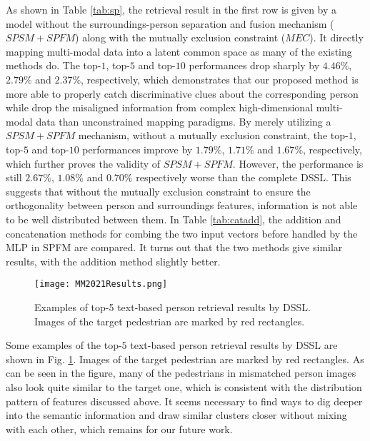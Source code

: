 \documentclass[sigconf]{acmart}
\begin{document}
As shown in Table \ref{tab:sp}, the retrieval result in the first row is given by a model without the surroundings-person separation and fusion mechanism ($SPSM + SPFM$) along with the mutually exclusion constraint ($MEC$). It directly mapping multi-modal data into a latent common space as many of the existing methods do. The top-$1$, top-$5$ and top-$10$ performances drop sharply by $4.46\%$, $2.79\%$ and $2.37\%$, respectively, which demonstrates that our proposed method is more able to properly catch discriminative clues about the corresponding person while drop the misaligned information from complex high-dimensional multi-modal data than unconstrained mapping paradigms. By merely utilizing a $SPSM + SPFM$ mechanism, without a mutually exclusion constraint, the top-$1$, top-$5$ and top-$10$ performances improve by $1.79\%$, $1.71\%$ and $1.67\%$, respectively, which further proves the validity of $SPSM + SPFM$. However, the performance is still $2.67\%$, $1.08\%$ and $0.70\%$ respectively worse than the complete DSSL. This suggests that without the mutually exclusion constraint to ensure the orthogonality between person and surroundings features, information is not able to be well distributed between them. In Table \ref{tab:catadd}, the addition and concatenation methods for combing the two input vectors before handled by the MLP in SPFM are compared. It turns out that the two methods give similar results, with the addition method slightly better.

\begin{figure}[h]
	\centering
	\texttt{[image: MM2021Results.png]}
	\caption{Examples of top-5 text-based person retrieval results by DSSL. Images of the target pedestrian are marked by red rectangles.}
	\label{fig:results}
\end{figure}

Some examples of the top-$5$ text-based person retrieval results by DSSL are shown in Fig. \ref{fig:results}. Images of the target pedestrian are marked by red rectangles. As can be seen in the figure, many of the pedestrians in mismatched person images also look quite similar to the target one, which is consistent with the distribution pattern of features discussed above. It seems necessary to find ways to dig deeper into the semantic information and draw similar clusters closer without mixing with each other, which remains for our future work.
\end{document}
